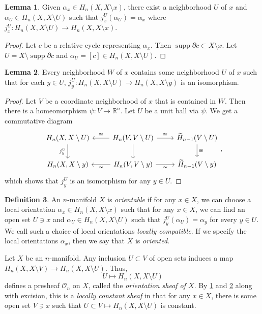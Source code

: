 \documentclass[10pt,letterpaper,cm]{nupset}
\theoremstyle{definition}
\newtheorem{definition}{Definition}[subsection]
\theoremstyle{theorem}
\newtheorem{lemma}[definition]{Lemma}
\theoremstyle{remark}
\newcommand{\R}{\mathbb{R}}
\newcommand{\1}{\mathbb{1}}
\newcommand{\0}{\vec 0}
\DeclareMathOperator{\supp}{supp}
\begin{document}
\begin{lemma}\label{lem}
Given $\alpha_x \in H_n(X, X\setminus x)$, there exist a neighborhood $U$ of $x$ and $\alpha_U \in H_n(X, X \setminus U)$ such that $j_x^U(\alpha_U) = \alpha_x$ where $j_x^U : H_n(X, X \setminus U) \to H_n(X, X \setminus x)$.
\end{lemma}
\begin{proof}
Let $c$ be a relative cycle representing $\alpha_x$. Then $\supp{\partial{c}} \subset X \setminus x$. Let $U = X \setminus \supp{\partial{c}}$ and $\alpha_U = [c] \in H_n(X, X\setminus U)$.
\end{proof}

\begin{lemma}\label{lem2}
Every neighborhood $W$ of $x$ contains some neighborhood $U$ of $x$ such that for each $y \in U$, $j_y^U : H_n(X, X\setminus U) \to H_n(X, X\setminus y)$ is an isomorphism. 
\end{lemma}
\begin{proof}
Let $V$ be a coordinate neighborhood of $x$ that is contained in $W$. Then there is a homeomorphism $\psi : V \to \R^n$. Let $U$ be a unit ball via $\psi$. We get a commutative diagram
\[
\begin{tikzcd}
{H_n(X, X \setminus U)} \arrow[d, "j_y^U"'] & {H_n(V, V \setminus U)} \arrow[l, "\cong"'] \arrow[d] \arrow[r, "\cong"] & \widetilde{H}_{n-1}(V \setminus U) \arrow[d, "\cong"] \\
{H_n(X, X\setminus y)}                      & {H_n(V, V \setminus y)} \arrow[l, "\cong"] \arrow[r, "\cong"']           & \widetilde{H}_{n-1}(V \setminus y)                   
\end{tikzcd}
,\] which shows that $j_y^U$ is an isomorphism for any $y \in U$.
\end{proof}

\begin{definition}
An  $n$-manifold $X$ is \textit{orientable} if for any $x\in X$, we can choose a local orientation $\alpha_x \in H_n(X, X \setminus x)$ such that for any $x\in X$, we can find an open set $U \ni x$ and $\alpha_U \in H_n(X, X \setminus U)$ such that $j_y^U(\alpha_U) = \alpha_y$ for every $y\in U$. We call such a choice of local orientations \textit{locally compatible}.  If we specify the local orientations $\alpha_x$, then we say that $X$ is \textit{oriented}. 
\end{definition}


Let $X$ be an $n$-manifold. Any inclusion $U \subset V$ of open sets induces a map $H_n(X, X \setminus V) \to H_n(X, X \setminus U)$. Thus, $$U \mapsto H_n(X, X \setminus U)$$ defines a presheaf $\mathcal{O}_n$ on $X$, called the \textit{orientation sheaf of $X$}. By \cref{lem} and \cref{lem2} along with excision, this is a \textit{locally constant sheaf} in that for any $x\in X$, there is some open set $V \ni x$ such that $U \subset V \mapsto H_n(X, X \setminus U)$ is constant.
\end{document}
